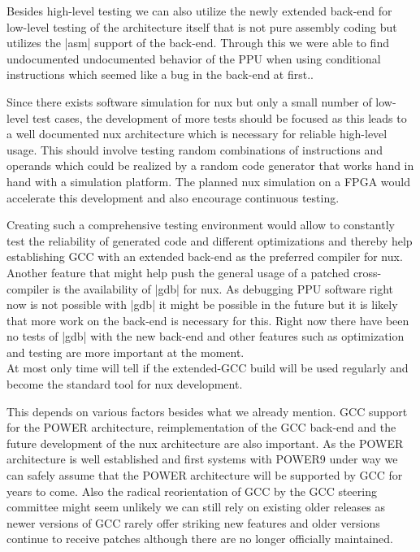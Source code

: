 Besides high-level testing we can also utilize the newly extended back-end for low-level testing of the architecture itself that is not pure assembly coding but utilizes the |asm| support of the back-end.
Through this we were able to find undocumented undocumented behavior of the PPU when using conditional instructions which seemed like a bug in the back-end at first..

Since there exists software simulation for nux but only a small number of low-level test cases, the development of more tests should be focused as this leads to a well documented nux architecture which is necessary for reliable high-level usage.
This should involve testing random combinations of instructions and operands which could be realized by a random code generator that works hand in hand with a simulation platform.
The planned nux simulation on a FPGA would accelerate this development and also encourage continuous testing.

Creating such a comprehensive testing environment would allow to constantly test the reliability of generated code and different optimizations and thereby help establishing GCC with an extended back-end as the preferred compiler for nux.
\\
Another feature that might help push the general usage of a patched cross-compiler is the availability of |gdb| for nux.
As debugging PPU software right now is not possible with |gdb| it might be possible in the future but it is likely that more work on the back-end is necessary for this.
Right now there have been no tests of |gdb| with the new back-end and other features such as optimization and testing are more important at the moment.
\\
At most only time will tell if the extended-GCC build will be used regularly and become the standard tool for nux development.

This depends on various factors besides what we already mention.
GCC support for the POWER architecture, reimplementation of the GCC back-end and the future development of the nux architecture are also important.
As the POWER architecture is well established and first systems with POWER9 under way we can safely assume that the POWER architecture will be supported by GCC for years to come.
Also the radical reorientation of GCC by the GCC steering committee might seem unlikely we can still rely on existing older releases as newer versions of GCC rarely offer striking new features and older versions continue to receive patches although there are no longer officially maintained.

